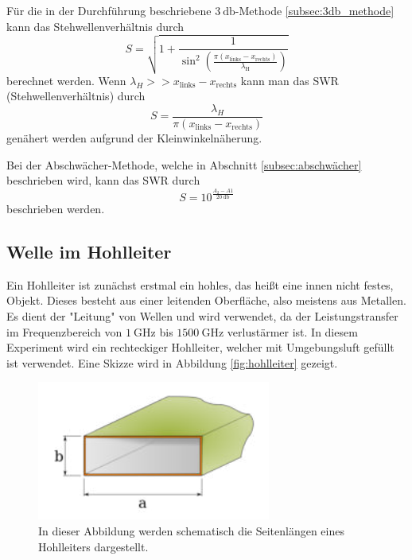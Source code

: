 Für die in der Durchführung beschriebene $\qty{3}{\decibel}$-Methode \ref{subsec:3db_methode} kann das Stehwellenverhältnis durch 
\begin{equation}
              \label{eqn:S_3dB}
              S = \sqrt{1+\frac{1}{\sin^2\left(\frac{\pi(x_\mathrm{links}-x_\mathrm{rechts})}{\lambda_\mathrm{H}}\right)}}
\end{equation}
berechnet werden. Wenn $\lambda_H >> x_\mathrm{links}-x_\mathrm{rechts}$ kann man das SWR (Stehwellenverhältnis) durch 
\begin{equation}
              \label{eqn:S_3dB_easy}
              S = \frac{\lambda_H}{\pi(x_\mathrm{links}-x_\mathrm{rechts})}
\end{equation}
genähert werden aufgrund der Kleinwinkelnäherung.

Bei der Abschwächer-Methode, welche in Abschnitt \ref{subsec:abschwächer} beschrieben wird, kann das SWR durch 
\begin{equation}
              \label{eqn:S_abschwaecher}
              S = 10^\frac{A_2-A1}{\qty{20}{\decibel}}
\end{equation}
beschrieben werden.
\subsection{Welle im Hohlleiter}
\label{subsec:hohlleiter}
Ein Hohlleiter ist zunächst erstmal ein hohles, das heißt eine innen nicht festes, Objekt. Dieses besteht aus einer leitenden Oberfläche, also meistens aus Metallen. Es dient der 
"Leitung" von Wellen und wird verwendet, da der Leistungstransfer im Frequenzbereich von $\qty{1}{\giga\hertz}$ bis $\qty{1500}{\giga\hertz}$ verlustärmer ist. In diesem Experiment
wird ein rechteckiger Hohlleiter, welcher mit Umgebungsluft gefüllt ist verwendet. Eine Skizze wird in Abbildung \ref{fig:hohlleiter} gezeigt.

\begin{figure}
              \centering
              \includegraphics{content/hohlleiter.PNG}
              \caption{In dieser Abbildung werden schematisch die Seitenlängen eines Hohlleiters dargestellt.}
              \label{fig:stehwelle}
\end{figure}

